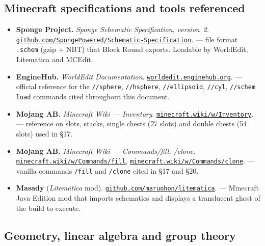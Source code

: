 \documentclass[12pt,a4paper]{scrartcl}
\newcommand{\code}[1]{\texttt{\small #1}}
\newcommand{\cmd}[1]{\textcolor{earth}{\texttt{\small #1}}}
\newcommand{\biblink}[2]{\href{#1}{\nolinkurl{#2}}}
\begin{document}
\subsection*{Minecraft specifications and tools referenced}

\begin{itemize}[leftmargin=1.4em,itemsep=0.3em,topsep=0.3em]
  \item \textbf{Sponge Project.} \emph{Sponge Schematic Specification, version~2}.
        \biblink{https://github.com/SpongePowered/Schematic-Specification}{github.com/SpongePowered/Schematic-Specification}.
        --- file format \code{.schem} (gzip + NBT) that Block Round exports. Loadable by WorldEdit, Litematica and MCEdit.

  \item \textbf{EngineHub.} \emph{WorldEdit Documentation}.
        \biblink{https://worldedit.enginehub.org/}{worldedit.enginehub.org}.
        --- official reference for the \cmd{//sphere}, \cmd{//hsphere}, \cmd{//ellipsoid}, \cmd{//cyl}, \cmd{//schem load} commands cited throughout this document.

  \item \textbf{Mojang AB.} \emph{Minecraft Wiki --- Inventory}.
        \biblink{https://minecraft.wiki/w/Inventory}{minecraft.wiki/w/Inventory}.
        --- reference on slots, stacks, single chests (27 slots) and double chests (54 slots) used in §17.

  \item \textbf{Mojang AB.} \emph{Minecraft Wiki --- Commands/fill, /clone}.
        \biblink{https://minecraft.wiki/w/Commands/fill}{minecraft.wiki/w/Commands/fill},
        \biblink{https://minecraft.wiki/w/Commands/clone}{minecraft.wiki/w/Commands/clone}.
        --- vanilla commands \cmd{/fill} and \cmd{/clone} cited in §17 and §20.

  \item \textbf{Masady} (\emph{Litematica} mod).
        \biblink{https://github.com/maruohon/litematica}{github.com/maruohon/litematica}.
        --- Minecraft Java Edition mod that imports schematics and displays a translucent ghost of the build to execute.
\end{itemize}

\subsection*{Geometry, linear algebra and group theory}
\end{document}
